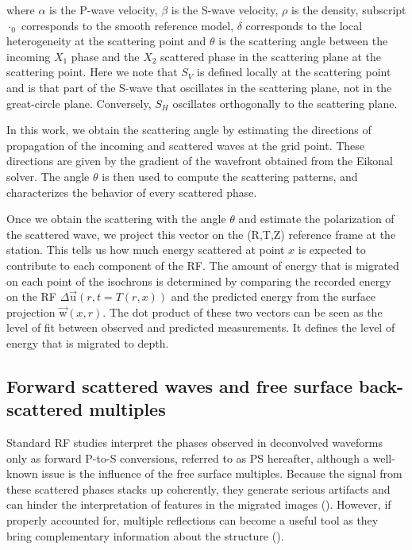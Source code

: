 \documentclass[9pt,a4paper]{article}
\numberwithin{equation}{section}
\begin{document}
\begin{multicols}{2}
\noindent where $\alpha$ is the P-wave velocity, 
$\beta$ is the S-wave velocity, 
$\rho$ is the density, 
subscript $\cdot_0$ corresponds to the smooth reference model, 
$\delta$ corresponds to the local heterogeneity at the scattering point and 
$\theta$ is the scattering angle between the incoming $X_1$ phase and the $X_2$ scattered phase in the scattering plane at the scattering point.
Here we note that $S_V$ is defined locally at the scattering point and is that part of the S-wave that oscillates in the scattering plane, not in the great-circle plane.
Conversely, $S_H$ oscillates orthogonally to the scattering plane.

In this work, we obtain the scattering angle by estimating the directions of propagation of the incoming and scattered waves at the grid point.
These directions are given by the gradient of the wavefront obtained from the Eikonal solver.
The angle $\theta$ is then used to compute the scattering patterns, and characterizes the behavior of every scattered phase.

Once we obtain the scattering with the angle $\theta$ and estimate the polarization of the scattered wave, we project this vector on the (R,T,Z) reference frame at the station.
This tells us how much energy scattered at point $x$ is expected to contribute to each component of the RF. 
The amount of energy that is migrated on each point of the isochrons is determined by comparing the recorded energy on the RF $\Delta\vec{\text{u}}(r,t=T(r,x))$  and the predicted energy from the surface projection $\vec{\text{w}}(x,r)$. 
The dot product of these two vectors can be seen as the level of fit between observed and predicted measurements. 
It defines the level of energy that is migrated to depth. 

\subsection{Forward scattered waves and free surface back-scattered multiples}

Standard RF studies interpret the phases observed in deconvolved waveforms only as forward P-to-S conversions, referred to as PS hereafter, although a well-known issue is the influence of the free surface multiples.
Because the signal from these scattered phases stacks up coherently, they generate serious artifacts and can hinder the interpretation of features in the migrated images (\cite{cheng_grl_17}).
However, if properly accounted for, multiple reflections can become a useful tool as they bring complementary information about the structure (\cite{tauz_epsl_16}). 


\end{multicols}
\end{document}
